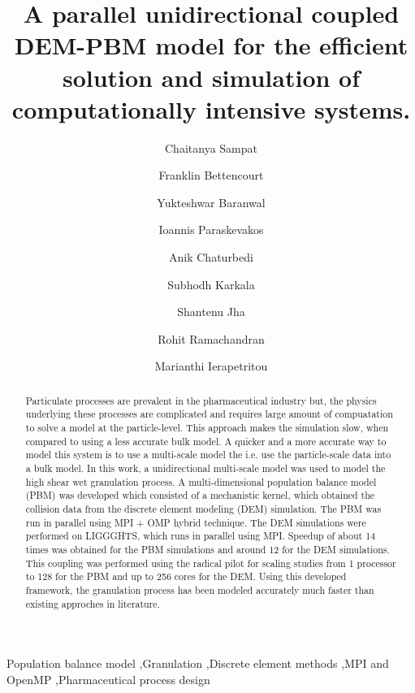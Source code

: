 \documentclass[preprint,11pt,authoryear]{elsarticle}
\begin{document}
\begin{frontmatter}

\title{A parallel unidirectional coupled DEM-PBM model for the efficient solution and simulation of 
computationally  intensive systems.}
\author[add1]{Chaitanya Sampat}
\author[add1]{Franklin Bettencourt}
\author[add1]{Yukteshwar Baranwal}
\author[add2]{Ioannis Paraskevakos}
\author[add1]{Anik Chaturbedi}
\author[add1]{Subhodh Karkala}
\author[add2]{Shantenu Jha}
\author[add1]{Rohit Ramachandran}
\author[add1]{Marianthi Ierapetritou}
\address[add1]{Department of Chemical and Biochemical Engineering, Rutgers, The State University of New
Jersey, Piscataway, NJ, USA-08854}
\address[add2]{Electrical and Computer Engineering, Rutgers, The State University of New Jersey, 
Piscataway, NJ, USA-08854}

\begin{abstract}
Particulate processes are prevalent in the pharmaceutical industry but, the physics underlying 
these processes are complicated and requires large amount of compuatation to solve a model at the
particle-level. This approach makes the simulation slow, when compared to using a less accurate 
bulk model. A quicker and a more accurate way to model this system is to use a multi-scale 
model the i.e. use the particle-scale data into a bulk model. 
In this work, a unidirectional multi-scale model was used to model the high shear wet granulation 
process. A multi-dimensional population balance model (PBM) was developed which 
consisted of a mechanistic kernel, which obtained the collision data from the discrete element 
modeling (DEM) simulation. The PBM was run in parallel using MPI + OMP hybrid technique. The DEM 
simulations were performed on
LIGGGHTS, which runs in parallel using MPI. Speedup of about 14 times was obtained for the PBM 
simulations and around 12 for the DEM simulations. This coupling was performed using the radical 
pilot for scaling studies from 1 processor to 128 for the PBM and up to 256 cores for the DEM. Using 
this developed framework, the granulation process has been modeled accurately 
much faster than existing approches in literature.
\end{abstract}
\begin{keyword}
Population balance model \sep Granulation \sep Discrete element methods  \sep MPI and OpenMP 
\sep Pharmaceutical process design
\end{keyword}
\end{frontmatter}
\linenumbers
\end{document}
